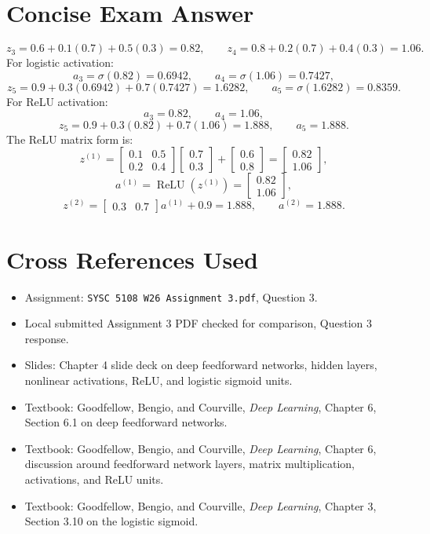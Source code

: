 \documentclass[11pt]{article}
\begin{document}
\section*{Concise Exam Answer}

\[
z_3=0.6+0.1(0.7)+0.5(0.3)=0.82,\qquad
z_4=0.8+0.2(0.7)+0.4(0.3)=1.06.
\]
For logistic activation:
\[
a_3=\sigma(0.82)=0.6942,\qquad
a_4=\sigma(1.06)=0.7427,
\]
\[
z_5=0.9+0.3(0.6942)+0.7(0.7427)=1.6282,
\qquad
a_5=\sigma(1.6282)=0.8359.
\]
For ReLU activation:
\[
a_3=0.82,\qquad a_4=1.06,
\]
\[
z_5=0.9+0.3(0.82)+0.7(1.06)=1.888,
\qquad
a_5=1.888.
\]
The ReLU matrix form is:
\[
z^{(1)}=
\begin{bmatrix}
0.1 & 0.5\\
0.2 & 0.4
\end{bmatrix}
\begin{bmatrix}
0.7\\
0.3
\end{bmatrix}
+
\begin{bmatrix}
0.6\\
0.8
\end{bmatrix}
=
\begin{bmatrix}
0.82\\
1.06
\end{bmatrix},
\]
\[
a^{(1)}=\operatorname{ReLU}(z^{(1)})
=
\begin{bmatrix}
0.82\\
1.06
\end{bmatrix},
\]
\[
z^{(2)}=
\begin{bmatrix}
0.3 & 0.7
\end{bmatrix}
a^{(1)}+0.9
=1.888,
\qquad
a^{(2)}=1.888.
\]

\section*{Cross References Used}

\begin{itemize}
\item Assignment: \texttt{SYSC 5108 W26 Assignment 3.pdf}, Question 3.
\item Local submitted Assignment 3 PDF checked for comparison, Question 3 response.
\item Slides: Chapter 4 slide deck on deep feedforward networks, hidden layers, nonlinear activations, ReLU, and logistic sigmoid units.
\item Textbook: Goodfellow, Bengio, and Courville, \textit{Deep Learning}, Chapter 6, Section 6.1 on deep feedforward networks.
\item Textbook: Goodfellow, Bengio, and Courville, \textit{Deep Learning}, Chapter 6, discussion around feedforward network layers, matrix multiplication, activations, and ReLU units.
\item Textbook: Goodfellow, Bengio, and Courville, \textit{Deep Learning}, Chapter 3, Section 3.10 on the logistic sigmoid.
\end{itemize}
\end{document}
